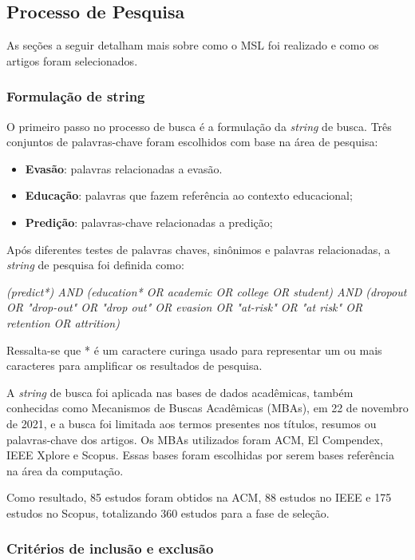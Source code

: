 \subsection{Processo de Pesquisa}
As seções a seguir detalham mais sobre como o MSL foi realizado e como os artigos foram selecionados.

\subsubsection{Formulação de string}
O primeiro passo no processo de busca é a formulação da \textit{string} de busca. Três conjuntos de palavras-chave foram escolhidos com base na área de pesquisa:

\begin{itemize}
\item \textbf{Evasão}: palavras relacionadas a evasão.
\item \textbf{Educação}: palavras que fazem referência ao contexto educacional;
\item \textbf{Predição}: palavras-chave relacionadas a predição;
\end{itemize}


Após diferentes testes de palavras chaves, sinônimos e palavras relacionadas, a \textit{string} de pesquisa foi definida como:

\begin{center}
\textit{\textit{(predict*) AND (education* OR academic OR college OR student) AND (dropout OR "drop-out" OR "drop out" OR evasion OR "at-risk" OR "at risk" OR retention OR attrition)}}
\end{center}

Ressalta-se que * é um caractere curinga usado para representar um ou mais caracteres para amplificar os resultados de pesquisa.

A \textit{string} de busca foi aplicada nas bases de dados acadêmicas, também conhecidas como Mecanismos de Buscas Acadêmicas (MBAs), em 22 de novembro de 2021, e a busca foi limitada aos termos presentes nos títulos, resumos ou palavras-chave dos artigos. Os MBAs utilizados foram ACM, El Compendex, IEEE Xplore e Scopus. Essas bases foram escolhidas por serem bases referência na área da computação.

Como resultado, 85 estudos foram obtidos na ACM, 88 estudos no IEEE e 175 estudos no Scopus, totalizando 360 estudos para a fase de seleção.

\subsubsection{Critérios de inclusão e exclusão}

